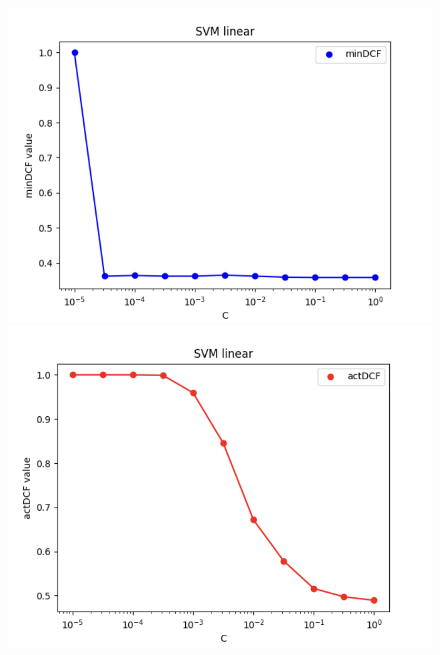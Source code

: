 \documentclass{article}
\begin{document}
\begin{figure}[H]
    \centering
    \begin{minipage}{.3\textwidth}
        \centering
        \includegraphics[width=\linewidth]{./img/SVM_L1.png}
    \end{minipage}%
    \begin{minipage}{.3\textwidth}
        \centering
        \includegraphics[width=\linewidth]{./img/SVM_L2.png}
    \end{minipage}
    \begin{minipage}{.3\textwidth}
        \centering

\end{minipage}
\end{figure}
\end{document}

